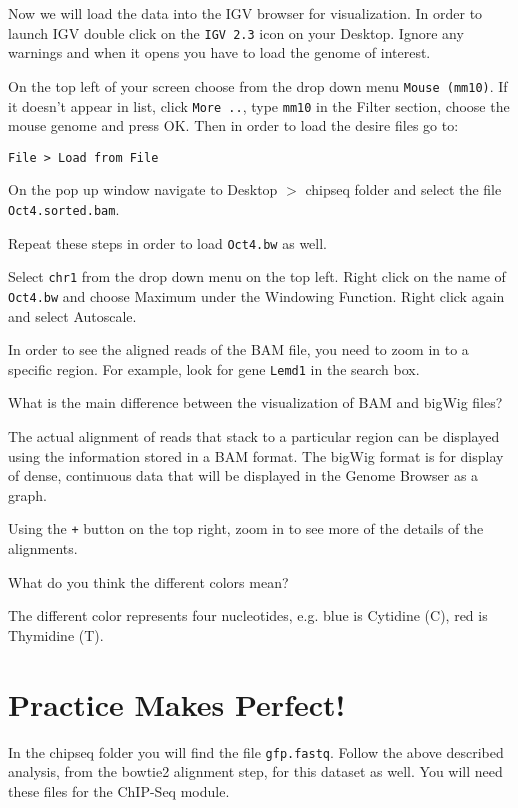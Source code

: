 \begin{steps}
Now we will load the data into the IGV browser for visualization. In order to
launch IGV double click on the \texttt{IGV 2.3} icon on your Desktop. Ignore any warnings
and when it opens you have to load the genome of interest.

On the top left of your screen choose from the drop down menu \texttt{Mouse (mm10)}. If it doesn't appear in list, click \texttt{More ..}, type \texttt{mm10} in the Filter section, choose the mouse genome and press OK. Then in order to load the desire files go to:

\begin{lstlisting}[style=command_syntax]
File > Load from File
\end{lstlisting}

On the pop up window navigate to Desktop $>$ chipseq folder and select the file
\texttt{Oct4.sorted.bam}.

Repeat these steps in order to load \texttt{Oct4.bw} as well.

Select \texttt{chr1} from the drop down menu on the top left. Right click on the name of
\texttt{Oct4.bw} and choose Maximum under the Windowing Function. Right click again and
select Autoscale.

In order to see the aligned reads of the BAM file, you need to zoom in to a
specific region. For example, look for gene \texttt{Lemd1} in the search box.
\end{steps}

\begin{questions}
What is the main difference between the visualization of BAM and bigWig files?
\begin{answer}
The actual alignment of reads that stack to a particular region can be displayed
using the information stored in a BAM format.
The bigWig format is for display of dense, continuous data that will be
displayed in the Genome Browser as a graph.
\end{answer}
\end{questions}

Using the \texttt{+} button on the top right, zoom in to see more of the details of the alignments.

\begin{questions}
What do you think the different colors mean?
\begin{answer}
The different color represents four nucleotides, e.g. blue is Cytidine (C), red
is Thymidine (T).
\end{answer}
\end{questions}

\section{Practice Makes Perfect!}
\begin{steps}
In the chipseq folder you will find the file \texttt{gfp.fastq}. Follow the
above described analysis, from the bowtie2 alignment step, for this dataset as
well. You will need these files for the ChIP-Seq module.
\end{steps}
